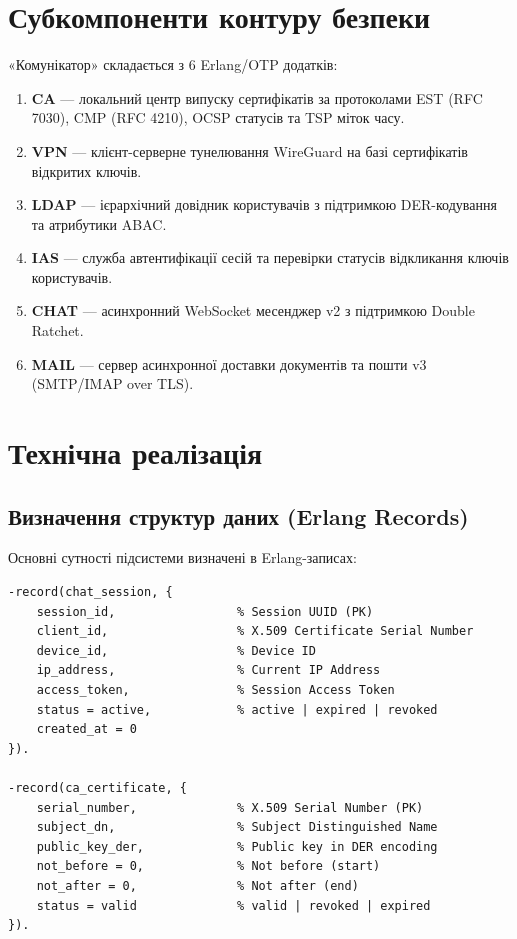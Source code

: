 \section{Субкомпоненти контуру безпеки}
«Комунікатор» складається з 6 Erlang/OTP додатків:
\begin{enumerate}
    \item \textbf{CA} --- локальний центр випуску сертифікатів за протоколами EST (RFC 7030), CMP (RFC 4210), OCSP статусів та TSP міток часу.
    \item \textbf{VPN} --- клієнт-серверне тунелювання WireGuard на базі сертифікатів відкритих ключів.
    \item \textbf{LDAP} --- ієрархічний довідник користувачів з підтримкою DER-кодування та атрибутики ABAC.
    \item \textbf{IAS} --- служба автентифікації сесій та перевірки статусів відкликання ключів користувачів.
    \item \textbf{CHAT} --- асинхронний WebSocket месенджер v2 з підтримкою Double Ratchet.
    \item \textbf{MAIL} --- сервер асинхронної доставки документів та пошти v3 (SMTP/IMAP over TLS).
\end{enumerate}

\section{Технічна реалізація}

\subsection{Визначення структур даних (Erlang Records)}
Основні сутності підсистеми визначені в Erlang-записах:
\begin{lstlisting}
-record(chat_session, {
    session_id,                 % Session UUID (PK)
    client_id,                  % X.509 Certificate Serial Number
    device_id,                  % Device ID
    ip_address,                 % Current IP Address
    access_token,               % Session Access Token
    status = active,            % active | expired | revoked
    created_at = 0
}).

-record(ca_certificate, {
    serial_number,              % X.509 Serial Number (PK)
    subject_dn,                 % Subject Distinguished Name
    public_key_der,             % Public key in DER encoding
    not_before = 0,             % Not before (start)
    not_after = 0,              % Not after (end)
    status = valid              % valid | revoked | expired
}).
\end{lstlisting}

